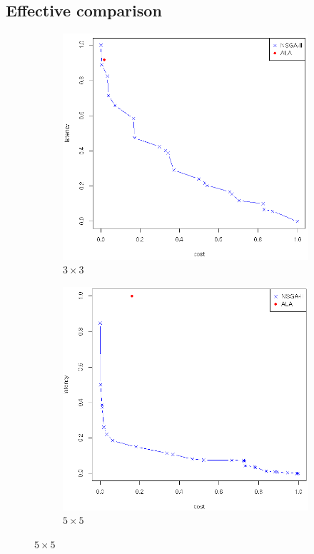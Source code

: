 \documentclass[twoside]{article}
\begin{document}
\subsection{Effective comparison}
\label{sec:comparison}
\begin{figure}[H]
	\centering
	\begin{subfigure}[b]{0.4\textwidth}
		\includegraphics[width=\textwidth]{pics/105.png}
		\caption{$3 \times 3$}
		\label{fig:3_by_3}
	\end{subfigure}%
	\begin{subfigure}[b]{0.4\textwidth}
		\includegraphics[width=\textwidth]{pics/107.png}
		\caption{$5 \times 5$}
		\label{fig:5_by_by_suff}
	\end{subfigure}



\end{figure}
\end{document}
